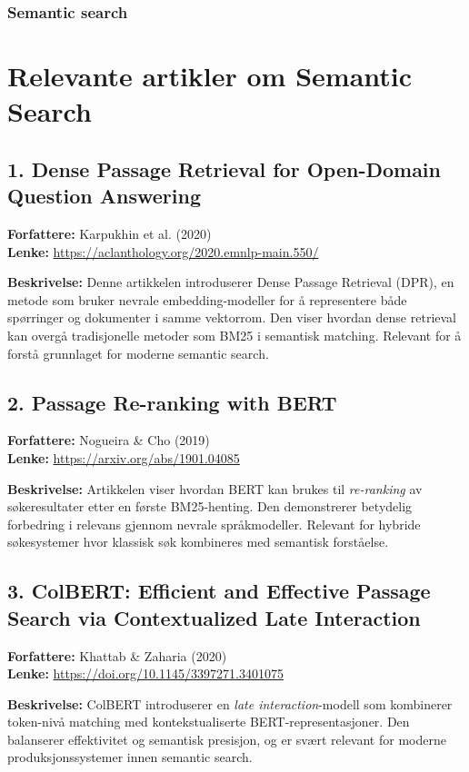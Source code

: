 \subsubsection{Semantic search}
\section*{Relevante artikler om Semantic Search}

\subsection*{1. Dense Passage Retrieval for Open-Domain Question Answering}

\textbf{Forfattere:} Karpukhin et al. (2020) \\
\textbf{Lenke:} \url{https://aclanthology.org/2020.emnlp-main.550/}

\textbf{Beskrivelse:}  
Denne artikkelen introduserer Dense Passage Retrieval (DPR), en metode som bruker nevrale embedding-modeller for å representere både spørringer og dokumenter i samme vektorrom. Den viser hvordan dense retrieval kan overgå tradisjonelle metoder som BM25 i semantisk matching. Relevant for å forstå grunnlaget for moderne semantic search.

\subsection*{2. Passage Re-ranking with BERT}

\textbf{Forfattere:} Nogueira \& Cho (2019) \\
\textbf{Lenke:} \url{https://arxiv.org/abs/1901.04085}

\textbf{Beskrivelse:}  
Artikkelen viser hvordan BERT kan brukes til \textit{re-ranking} av søkeresultater etter en første BM25-henting. Den demonstrerer betydelig forbedring i relevans gjennom nevrale språkmodeller. Relevant for hybride søkesystemer hvor klassisk søk kombineres med semantisk forståelse.

\subsection*{3. ColBERT: Efficient and Effective Passage Search via Contextualized Late Interaction}

\textbf{Forfattere:} Khattab \& Zaharia (2020) \\
\textbf{Lenke:} \url{https://doi.org/10.1145/3397271.3401075}

\textbf{Beskrivelse:}  
ColBERT introduserer en \textit{late interaction}-modell som kombinerer token-nivå matching med kontekstualiserte BERT-representasjoner. Den balanserer effektivitet og semantisk presisjon, og er svært relevant for moderne produksjonssystemer innen semantic search.


